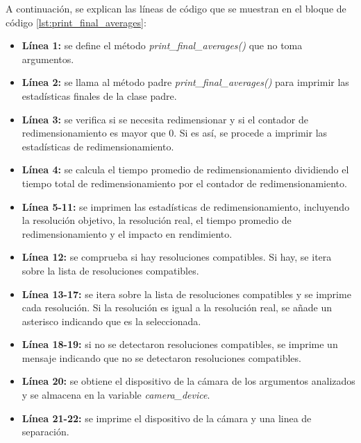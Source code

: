 A continuación, se explican las líneas de código que se muestran en el bloque de código \ref{lst:print_final_averages}:
\begin{itemize}
    \item \textbf{Línea 1:} se define el método \textit{print\_final\_averages()} que no toma argumentos.
    \item \textbf{Línea 2:} se llama al método padre \textit{print\_final\_averages()} para imprimir las estadísticas finales de la clase padre.
    \item \textbf{Línea 3:} se verifica si se necesita redimensionar y si el contador de redimensionamiento es mayor que 0. Si es así, se procede a imprimir las estadísticas de redimensionamiento.
    \item \textbf{Línea 4:} se calcula el tiempo promedio de redimensionamiento dividiendo el tiempo total de redimensionamiento por el contador de redimensionamiento.
    \item \textbf{Línea 5-11:} se imprimen las estadísticas de redimensionamiento, incluyendo la resolución objetivo, la resolución real, el tiempo promedio de redimensionamiento y el impacto en rendimiento.
    \item \textbf{Línea 12:} se comprueba si hay resoluciones compatibles. Si hay, se itera sobre la lista de resoluciones compatibles.
    \item \textbf{Línea 13-17:} se itera sobre la lista de resoluciones compatibles y se imprime cada resolución. Si la resolución es igual a la resolución real, se añade un asterisco indicando que es la seleccionada.
    \item \textbf{Línea 18-19:} si no se detectaron resoluciones compatibles, se imprime un mensaje indicando que no se detectaron resoluciones compatibles.
    \item \textbf{Línea 20:} se obtiene el dispositivo de la cámara de los argumentos analizados y se almacena en la variable \textit{camera\_device}.
    \item \textbf{Línea 21-22:} se imprime el dispositivo de la cámara y una linea de separación.
\end{itemize}

